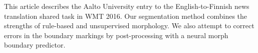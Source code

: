 This article describes the Aalto University entry to the English-to-Finnish news translation shared task in WMT 2016. Our segmentation method combines the strengths of rule-based and unsupervised morphology. We also attempt to correct errors in the boundary markings by post-processing with a neural morph boundary predictor.
